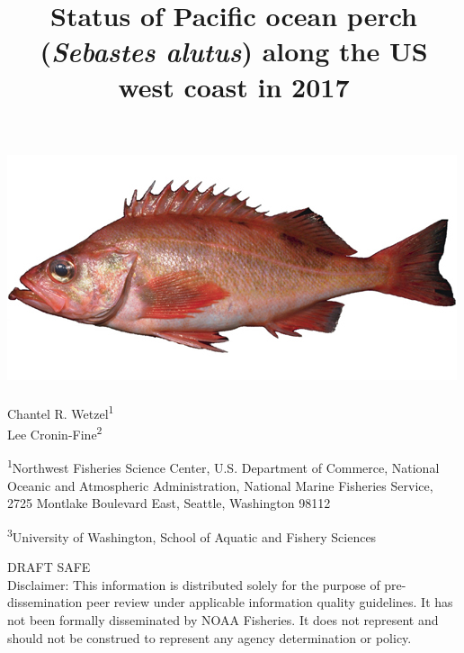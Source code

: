 \documentclass[12pt,]{article}
\title{Status of Pacific ocean perch (\emph{Sebastes alutus}) along the US west
coast in 2017}
\author{}
\date{}
\begin{document}
\maketitle


\begin{center}
\thispagestyle{empty}


\vspace{.5cm}

\includegraphics{Sebastes_alutus}~\\[0.5cm]



Chantel R. Wetzel\textsuperscript{1}\\
Lee Cronin-Fine\textsuperscript{2}\\

\vspace{.5cm}

\small
\textsuperscript{1}Northwest Fisheries Science Center, U.S. Department of Commerce, National Oceanic and Atmospheric Administration, National Marine Fisheries Service, 2725 Montlake Boulevard East, Seattle, Washington 98112\\

\vspace{.3cm}

\textsuperscript{3}University of Washington, School of Aquatic and Fishery Sciences\\





\vspace{1cm}

\vfill
DRAFT SAFE\\
Disclaimer: This information is distributed solely for the purpose of pre-dissemination
peer review under applicable information quality guidelines. It has not been formally
disseminated by NOAA Fisheries. It does not represent and should not be construed to
represent any agency determination or policy. 

\vspace{.3cm}

\maketitle

\setcounter{page}{1}
\end{center}
\end{document}

